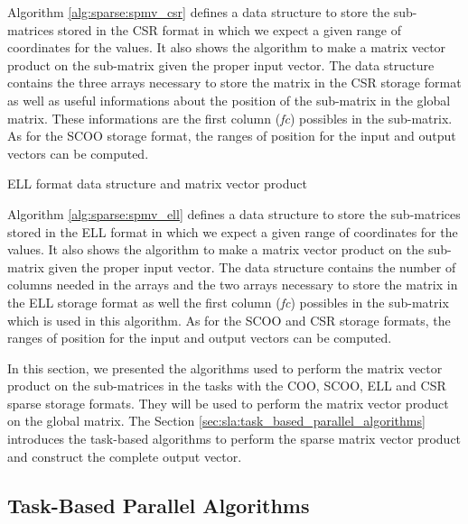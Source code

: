 Algorithm \ref{alg:sparse:spmv_csr} defines a data structure to store the sub-matrices stored in the CSR format in which we expect a given range of coordinates for the values.
It also shows the algorithm to make a matrix vector product on the sub-matrix given the proper input vector.
The data structure contains the three arrays necessary to store the matrix in the CSR storage format as well as useful informations about the position of the sub-matrix in the global matrix.
These informations are the first column (\textit{fc}) possibles in the sub-matrix.
As for the SCOO storage format, the ranges of position for the input and output vectors can be computed.


\begin{algorithm}[h]
	\DontPrintSemicolon
	\SetAlgoVlined
	\caption{ELL format data structure and matrix vector product\label{alg:sparse:spmv_ell}}

	\;
\end{algorithm}

Algorithm \ref{alg:sparse:spmv_ell} defines a data structure to store the sub-matrices stored in the ELL format in which we expect a given range of coordinates for the values.
It also shows the algorithm to make a matrix vector product on the sub-matrix given the proper input vector.
The data structure contains the number of columns needed in the arrays and the two arrays necessary to store the matrix in the ELL storage format as well the first column (\textit{fc}) possibles in the sub-matrix which is used in this algorithm.
As for the SCOO and CSR storage formats, the ranges of position for the input and output vectors can be computed.

In this section, we presented the algorithms used to perform the matrix vector product on the sub-matrices in the tasks with the COO, SCOO, ELL and CSR sparse storage formats.
They will be used to perform the matrix vector product on the global matrix.
The Section \ref{sec:sla:task_based_parallel_algorithms} introduces the task-based algorithms to perform the sparse matrix vector product and construct the complete output vector.

\subsection{Task-Based Parallel Algorithms \label{sec:sla:task_based_parallel_algorithms}}

